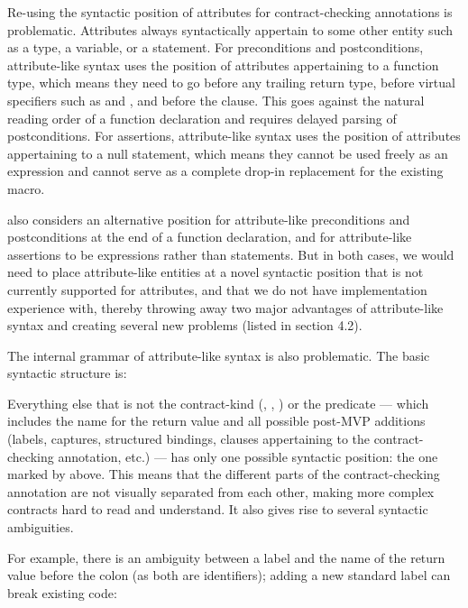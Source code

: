 Re-using the syntactic position of attributes for contract-checking annotations is problematic. Attributes always syntactically appertain to some other entity such as a type, a variable, or a statement. For preconditions and postconditions, attribute-like syntax uses the position of attributes appertaining to a function type, which means they need to go before any trailing return type, before virtual specifiers such as  and , and before the  clause. This goes against the natural reading order of a function declaration and requires delayed parsing of postconditions. For assertions, attribute-like syntax uses the position of attributes appertaining to a null statement, which means they cannot be used freely as an expression and cannot serve as a complete drop-in replacement for the existing  macro.

\cite{P2935R3} also considers an alternative position for attribute-like preconditions and postconditions at the end of a function declaration, and for attribute-like assertions to be expressions rather than statements. But in both cases, we would need to place attribute-like entities at a novel syntactic position that is not currently supported for attributes, and that we do not have implementation experience with, thereby throwing away two major advantages of attribute-like syntax and creating several new problems (listed in \cite{P2935R3} section 4.2).

The internal grammar of attribute-like syntax is also problematic. The basic syntactic structure is:

\phantom{~~~}

Everything else that is not the contract-kind (, , ) or the predicate --- which includes the name for the return value and all possible post-MVP additions (labels, captures, structured bindings,  clauses appertaining to the contract-checking annotation, etc.) --- has only one possible syntactic position: the one marked by \tcode{***} above.  This means that the different parts of the contract-checking annotation are not visually separated from each other, making more complex contracts hard to read and understand. It also gives rise to several syntactic ambiguities.

For example, there is an ambiguity between a label and the name of the return value before the colon (as both are identifiers); adding a new standard label can break existing code:

